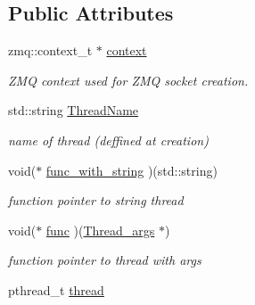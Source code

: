 \subsection*{Public Attributes}
\begin{DoxyCompactItemize}
\item 
\hypertarget{structThread__args_a7f2bf0637bd8774d37ddfb6096bbe448}{zmq\-::context\-\_\-t $\ast$ \hyperlink{structThread__args_a7f2bf0637bd8774d37ddfb6096bbe448}{context}}\label{structThread__args_a7f2bf0637bd8774d37ddfb6096bbe448}

\begin{DoxyCompactList}\small\item\em Z\-M\-Q context used for Z\-M\-Q socket creation. \end{DoxyCompactList}\item 
\hypertarget{structThread__args_a594f831be7ce66015a7606e023b24cf4}{std\-::string \hyperlink{structThread__args_a594f831be7ce66015a7606e023b24cf4}{Thread\-Name}}\label{structThread__args_a594f831be7ce66015a7606e023b24cf4}

\begin{DoxyCompactList}\small\item\em name of thread (deffined at creation) \end{DoxyCompactList}\item 
\hypertarget{structThread__args_a2cf8fd4407da28da635b68f47be5f8f5}{void($\ast$ \hyperlink{structThread__args_a2cf8fd4407da28da635b68f47be5f8f5}{func\-\_\-with\-\_\-string} )(std\-::string)}\label{structThread__args_a2cf8fd4407da28da635b68f47be5f8f5}

\begin{DoxyCompactList}\small\item\em function pointer to string thread \end{DoxyCompactList}\item 
\hypertarget{structThread__args_a674c5df8bb54ea3f96befbef2dfb1a78}{void($\ast$ \hyperlink{structThread__args_a674c5df8bb54ea3f96befbef2dfb1a78}{func} )(\hyperlink{structThread__args}{Thread\-\_\-args} $\ast$)}\label{structThread__args_a674c5df8bb54ea3f96befbef2dfb1a78}

\begin{DoxyCompactList}\small\item\em function pointer to thread with args \end{DoxyCompactList}\item 
\hypertarget{structThread__args_a4f71beb11e75d05269fc63ca7c19a8a9}{pthread\-\_\-t \hyperlink{structThread__args_a4f71beb11e75d05269fc63ca7c19a8a9}{thread}}\label{structThread__args_a4f71beb11e75d05269fc63ca7c19a8a9}


\end{DoxyCompactItemize}
